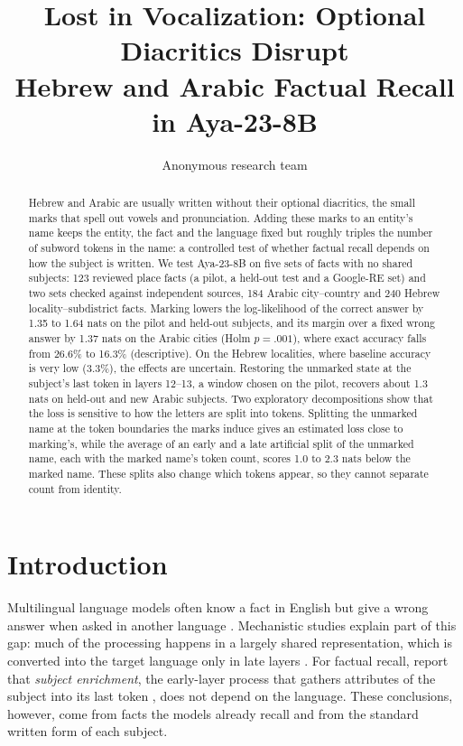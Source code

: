 \documentclass[11pt]{article}
\title{Lost in Vocalization: Optional Diacritics Disrupt\\Hebrew and Arabic Factual Recall in Aya-23-8B}
\author{Anonymous research team}
\begin{document}
\maketitle

\begin{abstract}
Hebrew and Arabic are usually written without their optional diacritics, the
small marks that spell out vowels and pronunciation. Adding these marks to an
entity's name keeps the entity, the fact and the language fixed but roughly
triples the number of subword tokens in the name: a controlled test of whether
factual recall depends on how the subject is written. We test
Aya-23-8B on five sets of facts with no shared subjects: 123 reviewed place facts
(a pilot, a held-out test and a Google-RE set) and two sets checked against
independent sources, 184 Arabic city--country and 240 Hebrew
locality--subdistrict facts. Marking lowers the log-likelihood of the correct
answer by 1.35 to 1.64 nats on the pilot and held-out subjects, and its margin
over a fixed wrong answer by 1.37 nats on the Arabic cities (Holm $p=.001$),
where exact accuracy falls from 26.6\% to 16.3\% (descriptive). On the Hebrew localities, where baseline accuracy is very low (3.3\%), the effects are uncertain.
Restoring the unmarked state at the subject's last token in layers 12--13,
a window chosen on the pilot, recovers about 1.3 nats on held-out and new Arabic
subjects. Two exploratory decompositions show that the loss is sensitive to how
the letters are split into tokens. Splitting the unmarked name at the token
boundaries the marks induce gives an estimated loss close to marking's, while the average of an early and a late artificial split of the unmarked
name, each with the marked name's token count, scores 1.0 to 2.3 nats below the
marked name. These splits also change which tokens
appear, so they cannot separate count from identity.
\end{abstract}

\section{Introduction}
\label{sec:intro}

Multilingual language models often know a fact in English but give a wrong
answer when asked in another language
\citep{jiang-etal-2020-x,kassner-etal-2021-multilingual,qi-etal-2023-cross}.
Mechanistic studies explain part of this gap: much of the processing happens in a
largely shared representation, which is converted into the target language only
in late layers
\citep{wendler-etal-2024-llamas,dumas-etal-2025-separating,wang-etal-2025-lost-multilinguality}.
For factual recall, \citet{fierro-etal-2025-multilingual} report that
\emph{subject enrichment}, the early-layer process that gathers attributes of the
subject into its last token \citep{geva-etal-2023-dissecting}, does not depend on
the language. These conclusions, however, come from facts the models already
recall and from the standard written form of each subject.
\end{document}
